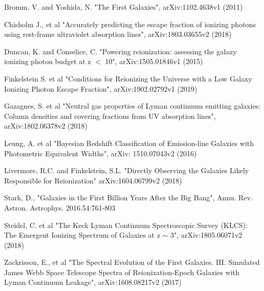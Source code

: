 \documentclass{aastex62}
\begin{document}
\begin{thebibliography}{}
Bromm, V. and Yoshida, N. "The First Galaxies", arXiv:1102.4638v1 (2011)

Chisholm J., et al "Accurately predicting the escape fraction of ionizing photons using rest-frame ultraviolet absorption lines", arXiv:1803.03655v2 (2018)

Duncan, K. and Conselice, C. "Powering reionization: assessing the galaxy ionizing photon budget at z $<$ 10", arXiv:1505.01846v1 (2015)

Finkelstein S. et al "Conditions for Reionizing the Universe with a Low Galaxy Ionizing Photon Escape Fraction", arXiv:1902.02792v1 (2019)

Gazagnes, S. et al "Neutral gas properties of Lyman continuum emitting galaxies: Column densities and covering fractions from UV absorption lines", arXiv:1802.06378v2 (2018)

Leung, A. et al "Bayesian Redshift Classification of Emission-line Galaxies with Photometric Equivalent Widths", arXiv: 1510.07043v2 (2016)

Livermore, R.C. and Finkelstein, S.L. "Directly Observing the Galaxies Likely Responsible for Reionization" arXiv:1604.06799v2 (2018)

Stark, D., "Galaxies in the First Billion Years After the Big Bang", Annu. Rev. Astron. Astrophys. 2016.54:761-803

Steidel, C. et al "The Keck Lyman Continuum Spectroscopic Survey (KLCS): The Emergent Ionizing Spectrum of Galaxies at z $\sim$ 3", arXiv:1805.06071v2 (2018)


Zackrisson, E., et al "The Spectral Evolution of the First Galaxies. III. Simulated James Webb Space Telescope Spectra of Reionization-Epoch Galaxies with Lyman Continuum Leakage", arXiv:1608.08217v2 (2017)

\end{thebibliography}




\end{document}
